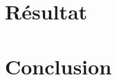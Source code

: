 \documentclass[letterpaper]{article}
\begin{document}
\section{Résultat}


\section{Conclusion}
  
  
% 
  

\footnotesize


\end{document}
